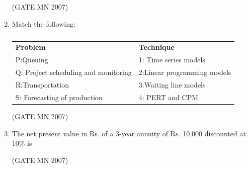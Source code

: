 \documentclass[journal]{IEEEtran}
\begin{document}
\begin{enumerate}
\hfill (GATE MN 2007)
\begin{enumerate}

\end{enumerate}


\item Match the following:\\
	\begin{table}[H]
    \centering\normalsize
\begin{tabular}{p{4.5cm} p{6cm}}                
\textbf{Problem} & \textbf{Technique}      \\                                              
P:Queuing & 1: Time series models \\            
Q: Project scheduling and monitoring & 2:Linear programming models \\  
R:Transportation & 3:Waiting line models \\     
S: Forecasting of production & 4: PERT and CPM \\
\end{tabular}
    \caption{}
    \label{tab:Q63}
\end{table}
	

\hfill (GATE MN 2007)
\begin{enumerate}
\end{enumerate}


\item The net present value in Rs. of a 3-year annuity of Rs. 10,000 discounted at 10\% is  


	\hfill (GATE MN 2007)
\begin{enumerate}
\end{enumerate}



\end{enumerate}
\end{document}

